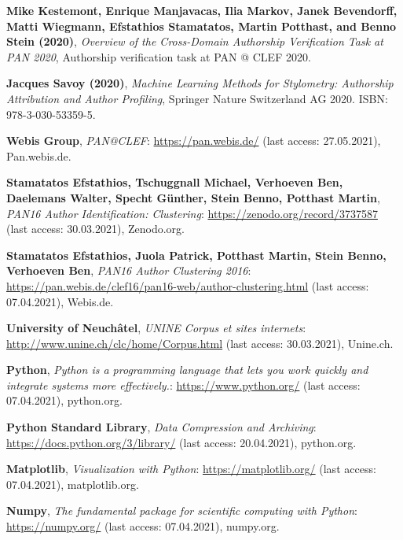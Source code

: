 \begin{thebibliography}{9}
\textbf{Mike Kestemont, Enrique Manjavacas, Ilia Markov, Janek Bevendorff, Matti Wiegmann, Efstathios Stamatatos, Martin Potthast, and Benno Stein (2020)},
\textit{Overview of the Cross-Domain Authorship Verification Task at PAN 2020},
Authorship verification task at PAN @ CLEF 2020.

\textbf{Jacques Savoy (2020)},
\textit{Machine Learning Methods for Stylometry: Authorship Attribution and Author Profiling},
Springer Nature Switzerland AG 2020. ISBN: 978-3-030-53359-5.


\textbf{Webis Group},
\textit{PAN@CLEF}: \url{https://pan.webis.de/} (last access: 27.05.2021),
Pan.webis.de.

\textbf{Stamatatos Efstathios, Tschuggnall Michael, Verhoeven Ben, Daelemans Walter, Specht Günther, Stein Benno, Potthast Martin},
\textit{PAN16 Author Identification: Clustering}: \url{https://zenodo.org/record/3737587} (last access: 30.03.2021),
Zenodo.org.

\textbf{Stamatatos Efstathios, Juola Patrick, Potthast Martin, Stein Benno, Verhoeven Ben},
\textit{PAN16 Author Clustering 2016}: \url{https://pan.webis.de/clef16/pan16-web/author-clustering.html} (last access: 07.04.2021),
Webis.de.

\textbf{University of Neuchâtel},
\textit{UNINE Corpus et sites internets}: \url{http://www.unine.ch/clc/home/Corpus.html} (last access: 30.03.2021),
Unine.ch.


\textbf{Python},
\textit{Python is a programming language that lets you work quickly and integrate systems more effectively.}: \url{https://www.python.org/} (last access: 07.04.2021),
python.org.

\textbf{Python Standard Library},
\textit{Data Compression and Archiving}: \url{https://docs.python.org/3/library/} (last access: 20.04.2021),
python.org.

\textbf{Matplotlib},
\textit{Visualization with Python}: \url{https://matplotlib.org/} (last access: 07.04.2021),
matplotlib.org.

\textbf{Numpy},
\textit{The fundamental package for scientific computing with Python}: \url{https://numpy.org/} (last access: 07.04.2021),
numpy.org.


\end{thebibliography}
